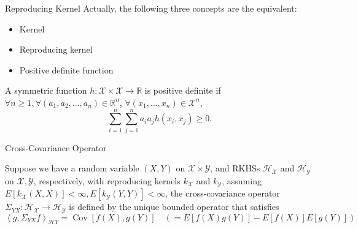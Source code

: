 \begin{frame}{Reproducing Kernel}
Actually, the following three concepts are the equivalent:
\begin{itemize}
	\item Kernel
	\item Reproducing kernel
	\item Positive definite function
\end{itemize}

\begin{definition}
A symmetric function $h:\mathcal X \times \mathcal X \rightarrow \mathbb R$ is positive definite if $\forall n \ge 1,\forall (a_1, a_2, \dots, a_n)\in \mathbb R^n$, $\forall (x_1, \dots, x_n)\in \mathcal X^n$,
\begin{equation}
	\sum_{i=1}^n \sum_{j=1}^n a_i a_j h(x_i, x_j)\ge 0.
\end{equation}
	
\end{definition}


\end{frame}



\begin{frame}{Cross-Covariance Operator}
\begin{definition}
Suppose we have a random variable $(X, Y)$ on $\mathcal X\times \mathcal Y$, and RKHSs $\mathcal H_{\mathcal X}$ and $\mathcal H_{\mathcal Y}$ on $\mathcal X, \mathcal Y$, respectively, with reproducing kernels $k_{\mathcal X}$ and $k_{\mathcal Y}$, assuming $E\left[k_{\mathcal{X}}(X, X)\right]<\infty, E\left[k_{\mathcal{Y}}(Y, Y)\right]<\infty$, the cross-covariance operator $\Sigma_{YX}:\mathcal H_{\mathcal X} \rightarrow \mathcal H_{\mathcal Y}$ is defined by the unique bounded operator that satisfies
\begin{equation}
	\left\langle g, \Sigma_{Y X} f\right\rangle_{\mathcal{H} Y}=\operatorname{Cov}[f(X), g(Y)] \quad(=E[f(X) g(Y)]-E[f(X)] E[g(Y)])
\end{equation}
\end{definition}

\end{frame}


